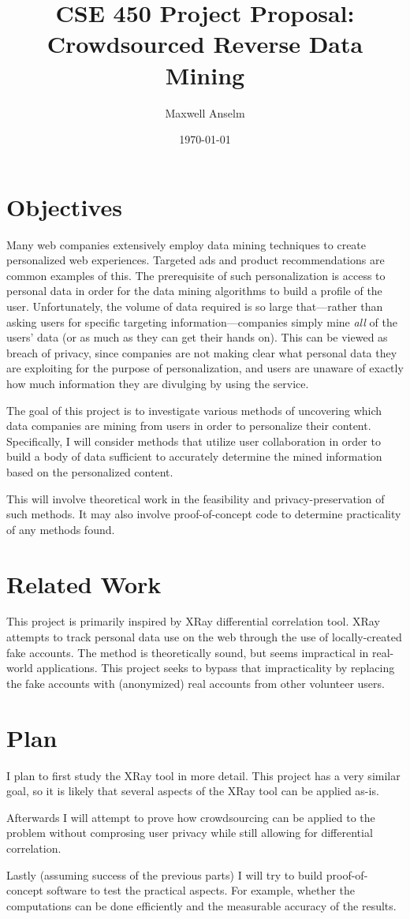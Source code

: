 \documentclass{article}
\title{CSE 450 Project Proposal:\\Crowdsourced Reverse Data Mining}
\author{Maxwell Anselm}
\date{\today}
\begin{document}
\maketitle

\section{Objectives}

Many web companies extensively employ data mining techniques to create
personalized web experiences. Targeted ads and product recommendations are
common examples of this. The prerequisite of such personalization
is access to personal data in order for the data mining algorithms to build a
profile of the user. Unfortunately, the volume of data required is so large
that---rather than asking users for specific targeting information---companies
simply mine {\it all} of the users' data (or as much as they can get their hands
on). This can be viewed as breach of privacy, since companies are not making
clear what personal data they are exploiting for the purpose of personalization,
and users are unaware of exactly how much information they are divulging by
using the service.

The goal of this project is to investigate various methods of uncovering which
data companies are mining from users in order to personalize their content.
Specifically, I will consider methods that utilize user collaboration in order
to build a body of data sufficient to accurately determine the mined information
based on the personalized content.

This will involve theoretical work in the feasibility and privacy-preservation
of such methods. It may also involve proof-of-concept code to determine
practicality of any methods found.

\section{Related Work}

This project is primarily inspired by XRay differential correlation tool. XRay
attempts to track personal data use on the web through the use of
locally-created fake accounts. The method is theoretically sound, but seems
impractical in real-world applications. This project seeks to bypass that
impracticality by replacing the fake accounts with (anonymized) real accounts
from other volunteer users.

\section{Plan}

I plan to first study the XRay tool in more detail. This project has a very
similar goal, so it is likely that several aspects of the XRay tool can be
applied as-is.

Afterwards I will attempt to prove how crowdsourcing can be applied to the
problem without comprosing user privacy while still allowing for differential
correlation.

Lastly (assuming success of the previous parts) I will try to build
proof-of-concept software to test the practical aspects. For example, whether
the computations can be done efficiently and the measurable accuracy of the
results.
\end{document}
